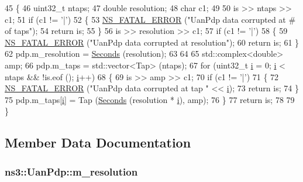 \begin{DoxyCode}
45 \{
46   uint32\_t ntaps;
47   \textcolor{keywordtype}{double} resolution;
48   \textcolor{keywordtype}{char} c1;
49 
50   is >> ntaps >> c1;
51   \textcolor{keywordflow}{if} (c1 != \textcolor{charliteral}{'|'})
52     \{
53       \hyperlink{group__fatal_ga5131d5e3f75d7d4cbfd706ac456fdc85}{NS\_FATAL\_ERROR} (\textcolor{stringliteral}{"UanPdp data corrupted at # of taps"});
54       \textcolor{keywordflow}{return} is;
55     \}
56   is >> resolution >> c1;
57   \textcolor{keywordflow}{if} (c1 != \textcolor{charliteral}{'|'})
58     \{
59       \hyperlink{group__fatal_ga5131d5e3f75d7d4cbfd706ac456fdc85}{NS\_FATAL\_ERROR} (\textcolor{stringliteral}{"UanPdp data corrupted at resolution"});
60       \textcolor{keywordflow}{return} is;
61     \}
62   pdp.m\_resolution = \hyperlink{group__timecivil_ga33c34b816f8ff6628e33d5c8e9713b9e}{Seconds} (resolution);
63 
64 
65   std::complex<double> amp;
66   pdp.m\_taps = std::vector<Tap> (ntaps);
67   \textcolor{keywordflow}{for} (uint32\_t \hyperlink{bernuolliDistribution_8m_a6f6ccfcf58b31cb6412107d9d5281426}{i} = 0; \hyperlink{bernuolliDistribution_8m_a6f6ccfcf58b31cb6412107d9d5281426}{i} < ntaps && !is.eof (); \hyperlink{bernuolliDistribution_8m_a6f6ccfcf58b31cb6412107d9d5281426}{i}++)
68     \{
69       is >> amp >> c1;
70       \textcolor{keywordflow}{if} (c1 != \textcolor{charliteral}{'|'})
71         \{
72           \hyperlink{group__fatal_ga5131d5e3f75d7d4cbfd706ac456fdc85}{NS\_FATAL\_ERROR} (\textcolor{stringliteral}{"UanPdp data corrupted at tap "} << \hyperlink{bernuolliDistribution_8m_a6f6ccfcf58b31cb6412107d9d5281426}{i});
73           \textcolor{keywordflow}{return} is;
74         \}
75       pdp.m\_taps[\hyperlink{bernuolliDistribution_8m_a6f6ccfcf58b31cb6412107d9d5281426}{i}] = Tap (\hyperlink{group__timecivil_ga33c34b816f8ff6628e33d5c8e9713b9e}{Seconds} (resolution * \hyperlink{bernuolliDistribution_8m_a6f6ccfcf58b31cb6412107d9d5281426}{i}), amp);
76     \}
77   \textcolor{keywordflow}{return} is;
78 
79 \}
\end{DoxyCode}


\subsection{Member Data Documentation}
\subsubsection[{\texorpdfstring{m\+\_\+resolution}{m_resolution}}]{ ns3\+::\+Uan\+Pdp\+::m\+\_\+resolution\hspace{0.3cm}{\ttfamily [private]}}\hypertarget{classns3_1_1UanPdp_aac76e20be14850246e29cebc09468fa4}{}\label{classns3_1_1UanPdp_aac76e20be14850246e29cebc09468fa4}



